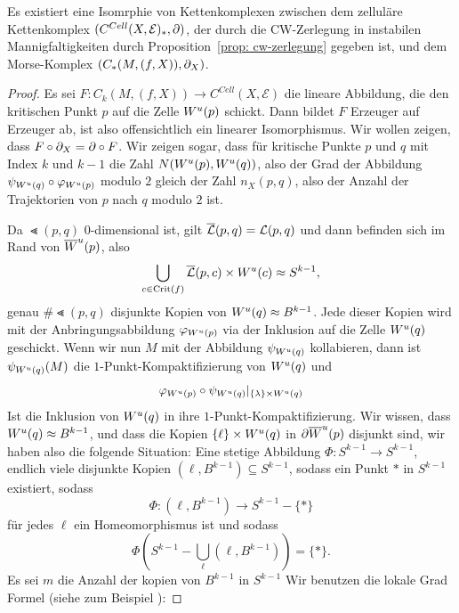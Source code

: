 \begin{theorem}
    \label{satz: morse-homologie ist zellulaere homologie}
    Es existiert eine Isomrphie von Kettenkomplexen zwischen dem zelluläre Kettenkomplex 
    $(C^{Cell}(X, \mathcal{E})_{\ast}, { \partial })$, der durch die CW-Zerlegung in instabilen 
    Mannigfaltigkeiten durch 
    Proposition~\ref{prop: cw-zerlegung} gegeben ist, und dem Morse-Komplex 
    $(C_{\ast}(M, (f, X)), { \partial }_X)$.
\end{theorem}

\begin{proof}
    Es sei $F \colon C_k (M, (f, X)) \to C^{Cell}(X, \mathcal{E})$ die lineare Abbildung, 
    die den kritischen Punkt $p$
    auf die Zelle ${ W^u } (p)$ schickt. Dann bildet $F$ Erzeuger auf Erzeuger ab, ist also 
    offensichtlich ein linearer Isomorphismus. Wir wollen zeigen, dass 
    $F \circ { \partial }_X = { \partial } \circ F$. Wir zeigen sogar, dass für kritische Punkte $p$ und $q$ mit 
    Index $k$ und $k - 1$ die Zahl $N ({ W^u } (p), { W^u } (q))$, also der Grad der Abbildung 
    $\psi_{{ W^u } (q)} \circ \varphi_{{ W^u } (p)}$ modulo $2$ gleich der Zahl $n_X(p, q)$, also 
    der Anzahl der Trajektorien von $p$ nach $q$ modulo $2$ ist. 

    Da $\Lt (p, q)$ $0$-dimensional ist, gilt ${\overline{\mathcal{L}} } (p, q) = { \mathcal{L} } (p, q)$ und dann befinden sich im 
    Rand von ${ \overline{W}^u } (p)$, also 
    \[ \bigcup_{c \in { \operatorname{Crit} } (f)} {\overline{\mathcal{L}} } (p, c) \times { W^u } (c) \approx S^{k - 1} , \] 
    genau $\# \Lt (p, q)$ disjunkte Kopien von ${ W^u } (q) \approx B^{k - 1}$. Jede dieser Kopien 
    wird mit der Anbringungsabbildung $\varphi_{{ W^u } (p)}$ via der Inklusion auf die Zelle ${ W^u } (q)$
    geschickt. Wenn wir nun $M$ mit der Abbildung $\psi_{{ W^u } (q)}$ kollabieren, dann ist 
    $\psi_{{ W^u } (q)} (M)$ die $1$-Punkt-Kompaktifizierung von ${ W^u } (q)$ und 
    \[ \varphi_{{ W^u } (p)} \circ \psi_{{ W^u } (q)} |_{ \{ \lambda \} \times { W^u } (q) } \]
    Ist die Inklusion von ${ W^u } (q)$ in ihre $1$-Punkt-Kompaktifizierung. Wir wissen, dass 
    ${ W^u } (q) \approx B^{k - 1}$, und dass die Kopien $\{ \ell \} \times { W^u } (q)$ in 
    ${ \partial } { \overline{W}^u } (p)$ disjunkt sind, wir haben also die folgende Situation:
    Eine stetige Abbildung $\Phi \colon S^{k - 1} \to S^{k - 1}$, endlich viele disjunkte Kopien 
    $(\ell, B^{k - 1}) \subseteq S^{k - 1}$, sodass ein Punkt $\ast$ in $S^{k - 1}$ existiert, sodass
    \[ \Phi \colon (\ell, B^{k - 1}) \to S^{k - 1} - \{ \ast \} \]
    für jedes $\ell$ ein Homeomorphismus ist und sodass
    \[ \Phi \left( S^{k - 1} - \bigcup_{\ell} \left( \ell, B^{k - 1} \right) \right) = \{ \ast \} . \]
    Es sei $m$ die Anzahl der kopien von $B^{k - 1}$ in $S^{k - 1}$
    Wir benutzen die lokale Grad Formel (siehe zum Beispiel \cite{hatcher}): 
    

\end{proof}

